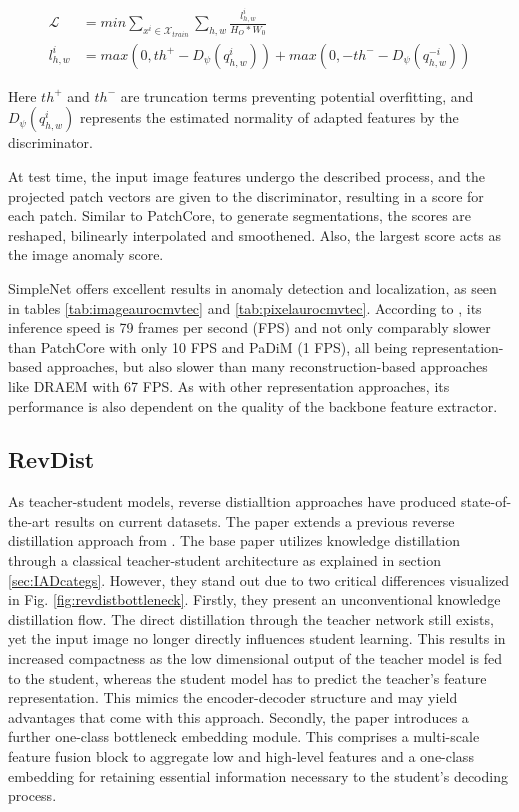 \begin{equation}
 \label{eq:simplenetloss}
 \begin{split}
 \mathcal{L} &= min \sum_{x^{i}\in \mathcal{X}_{train}} \sum_{h, w} \frac{l^{i}_{h,w}}{H_{O} * W_{0}} \\
 l^{i}_{h,w} &= max(0, th^{+} - D_{\psi}(q^{i}_{h,w})) + max(0, -th^{-} - D_{\psi}(q^{-i}_{h,w}))
 \end{split}
\end{equation} 

Here $th^{+}$ and $th^{-}$ are truncation terms preventing potential overfitting, and $D_{\psi}(q^{i}_{h,w})$ represents the estimated normality of adapted features by the discriminator.

At test time, the input image features undergo the described process, and the projected patch vectors are given to the discriminator, resulting in a score for each patch. Similar to 
PatchCore, to generate segmentations, the scores are reshaped, bilinearly interpolated and smoothened. Also, the largest score acts as the image anomaly score.

SimpleNet offers excellent results in anomaly detection and localization, as seen in tables \ref{tab:imageaurocmvtec} and \ref{tab:pixelaurocmvtec}. According to \cite{liu2023simplenet}, its inference speed is 79 frames per second (FPS) and 
not only comparably slower than PatchCore \cite{patchCore2022} with only 10 FPS 
and PaDiM \cite{Defard_2021PADIM} (1 FPS), all being representation-based approaches, but also slower than many reconstruction-based approaches like DRAEM with 67 FPS. As with other representation 
approaches, its performance is also dependent on the quality of the backbone feature extractor.


\subsection{RevDist}
\label{subsec:revdist}

As teacher-student models, reverse distialltion approaches \cite{revdist2023} \cite{Deng_2022basicrevdist} have produced state-of-the-art results on current datasets. The paper extends a previous reverse distillation approach from 
\cite{Deng_2022basicrevdist}. The base paper utilizes knowledge distillation through a classical teacher-student architecture as explained in section \ref{sec:IADcategs}. However, they stand out 
due to two critical differences visualized in Fig. \ref{fig:revdistbottleneck}. Firstly, they present an unconventional knowledge distillation flow. The direct distillation through the teacher network still exists, 
yet the input image no longer directly influences student learning. This results in increased compactness as the low dimensional output of the teacher model is fed to the student, 
whereas the student model has to predict the teacher's feature representation. This mimics the encoder-decoder structure and may yield advantages that come with this approach. Secondly, 
the paper introduces a further one-class bottleneck embedding module. This comprises a multi-scale feature fusion block to aggregate low and high-level features and a one-class embedding 
for retaining essential information necessary to the student's decoding process. 


